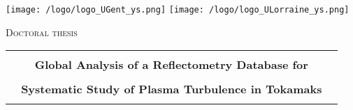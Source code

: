 \begin{titlepage}

\begin{center}
\texttt{[image: /logo/logo\_UGent\_ys.png]} \hspace{+1cm}
\texttt{[image: /logo/logo\_ULorraine\_ys.png]} \\

\vspace{0.3cm}


\vspace{0.3cm}
{\LARGE \textsc{Doctoral thesis\\}}



\vspace{0.3cm}

\begin{tabular}{c}
\noalign{\smallskip} \hline \hline \noalign{\smallskip}\\
{\Large \bf {{\Large~~~} Global Analysis of a Reflectometry Database for {\Large~~~}}}\\ \\
{\Large \bf {Systematic Study of Plasma Turbulence in Tokamaks }}\\ \\



\end{tabular}
\end{center}
\end{titlepage}
